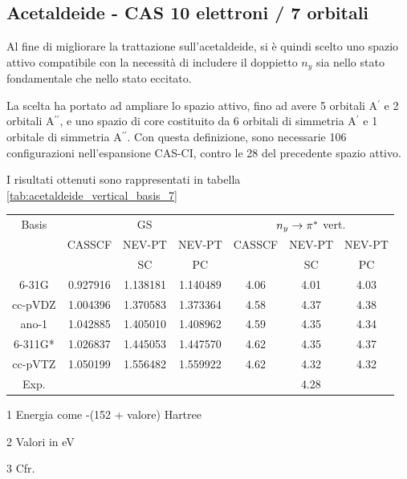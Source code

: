 \subsection{Acetaldeide - CAS 10 elettroni / 7 orbitali}

Al fine di migliorare la trattazione sull'acetaldeide, si \`e quindi scelto
uno spazio attivo compatibile con la necessit\`a di includere il doppietto $n_y$
sia nello stato fondamentale che nello stato eccitato.

La scelta ha portato ad ampliare lo spazio attivo, fino ad avere
5 orbitali A$^{\prime}$ e 2 orbitali A$^{\prime\prime}$,
e uno spazio di core costituito da 6 orbitali di simmetria A$^{\prime}$
e 1 orbitale di simmetria A$^{\prime\prime}$.
Con questa definizione, sono necessarie 106 configurazioni
nell'espansione CAS-CI, contro le 28 del precedente spazio attivo.

I risultati ottenuti sono rappresentati in tabella \ref{tab:acetaldeide_vertical_basis_7}
\begin{center}
\begin{threeparttable}
\caption{\small Acetaldeide - Energia di transizione verticale $n_y \rightarrow \pistar$ di singoletto, CAS 10 elettroni 7 orbitali}
\label{tab:acetaldeide_vertical_basis_7}
\small
\begin{tabular}{|c|ccc|ccc|}
\hline
Basis	& \multicolumn{3}{c|}{GS\tnote{1}}				& \multicolumn{3}{c|}{$n_y \rightarrow \pistar$ vert.\tnote{2}} \\
		& CASSCF		& NEV-PT	 	&	NEV-PT		& CASSCF		& NEV-PT	& NEV-PT	  \\
		& 				& SC 			&	PC			& 				& SC		& PC	 	 \\
\hline
6-31G	& 0.927916		& 1.138181		&	1.140489	& 4.06			& 4.01		& 4.03		\\
cc-pVDZ	& 1.004396		& 1.370583		&	1.373364	& 4.58			& 4.37		& 4.38		\\
ano-1	& 1.042885		& 1.405010		&	1.408962	& 4.59			& 4.35 		& 4.34		\\
6-311G*	& 1.026837		& 1.445053		&	1.447570	& 4.62			& 4.35		& 4.37		\\
cc-pVTZ & 1.050199		& 1.556482		&	1.559922	& 4.62			& 4.32		& 4.32		\\			
\hline
\hline
Exp.\tnote{3}&				& 				& 				& \multicolumn{3}{c|}{4.28} \\
\hline
\end{tabular}
\begin{tablenotes}
 \item[1] Energia come -(152 + valore) Hartree
 \item[2] Valori in eV
 \item[3] Cfr. \cite{jpc-97-17-1993-4293}
\end{tablenotes}
\end{threeparttable}
\end{center}

